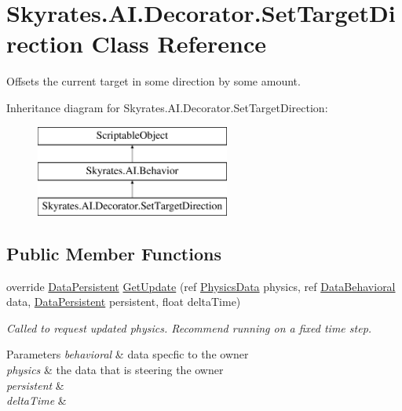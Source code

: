 \hypertarget{class_skyrates_1_1_a_i_1_1_decorator_1_1_set_target_direction}{\section{Skyrates.\-A\-I.\-Decorator.\-Set\-Target\-Direction Class Reference}
\label{class_skyrates_1_1_a_i_1_1_decorator_1_1_set_target_direction}
}


Offsets the current target in some direction by some amount.  


Inheritance diagram for Skyrates.\-A\-I.\-Decorator.\-Set\-Target\-Direction\-:\begin{figure}[H]
\begin{center}
\leavevmode
\includegraphics[height=3.000000cm]{class_skyrates_1_1_a_i_1_1_decorator_1_1_set_target_direction}
\end{center}
\end{figure}
\subsection*{Public Member Functions}
\begin{DoxyCompactItemize}
\item 
\hypertarget{class_skyrates_1_1_a_i_1_1_decorator_1_1_set_target_direction_ace19cfd127291e3be5cd7e2d7c8e4d46}{override \hyperlink{class_skyrates_1_1_a_i_1_1_behavior_1_1_data_persistent}{Data\-Persistent} \hyperlink{class_skyrates_1_1_a_i_1_1_decorator_1_1_set_target_direction_ace19cfd127291e3be5cd7e2d7c8e4d46}{Get\-Update} (ref \hyperlink{class_skyrates_1_1_physics_1_1_physics_data}{Physics\-Data} physics, ref \hyperlink{class_skyrates_1_1_a_i_1_1_behavior_1_1_data_behavioral}{Data\-Behavioral} data, \hyperlink{class_skyrates_1_1_a_i_1_1_behavior_1_1_data_persistent}{Data\-Persistent} persistent, float delta\-Time)}\label{class_skyrates_1_1_a_i_1_1_decorator_1_1_set_target_direction_ace19cfd127291e3be5cd7e2d7c8e4d46}

\begin{DoxyCompactList}\small\item\em Called to request updated physics. Recommend running on a fixed time step. 


\begin{DoxyParams}{Parameters}
{\em behavioral} & data specfic to the owner\\
\hline
{\em physics} & the data that is steering the owner\\
\hline
{\em persistent} & \\
\hline
{\em delta\-Time} & \\
\hline
\end{DoxyParams}
 \end{DoxyCompactList}\end{DoxyCompactItemize}
